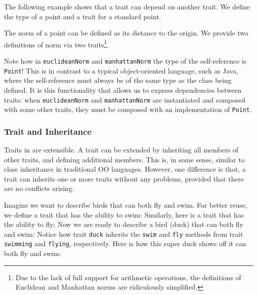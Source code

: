 The following example shows that a trait can depend on another trait. We define
the type of a point and a trait for a standard point.


The norm of a point can be defined as its distance to the origin. We provide two
definitions of norm via two traits\footnote{Due to the lack of full support for
  arithmetic operations, the definitions of Euclidean and Manhattan norms are
  ridiculously simplified. }.


Note how in \lstinline$euclideanNorm$ and \lstinline$manhattanNorm$ the type of
the self-reference is \lstinline$Point$! This is in contrast to a typical
object-oriented language, such as Java, where the self-reference must always be
of the same type as the class being defined. It is this functionality that
allows us to express dependencies between traits: when \lstinline$euclideanNorm$
and \lstinline$manhattanNorm$ are instantiated and composed with some other
traits, they must be composed with an implementation of \lstinline$Point$.

\subsubsection{Trait and Inheritance}

Traits in \name are extensible. A trait can be extended by inheriting all
members of other traits, and defining additional members. This is, in some
sense, similar to class inheritance in traditional OO languages. However, one
difference is that, a trait can inherits one or more traits without any
problems, provided that there are no conflicts arising.

Imagine we want to describe birds that can both fly and swim. For better reuse,
we define a trait that has the ability to swim:
Similarly, here is a trait that has the ability to fly:
Now we are ready to describe a bird (duck) that can both fly and swim:
Notice how trait \lstinline{duck} inherits the \lstinline{swim} and
\lstinline{fly} methods from trait \lstinline{swimming} and \lstinline{flying},
respectively. Here is how this super duck shows off it can both fly and swim:


